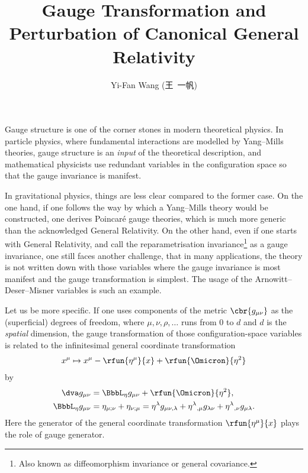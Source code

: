 \documentclass[a4paper,11pt]{article}
\title{Gauge Transformation and Perturbation of Canonical General 
Relativity}
\author{Yi-Fan Wang (王\ 一帆)}
\begin{document}
\maketitle

Gauge structure is one of the corner stones in modern theoretical physics. In 
particle physics, where fundamental interactions are modelled by Yang--Mills 
theories, gauge structure is an \emph{input} of the theoretical description, 
and mathematical physicists use redundant variables in the configuration space 
so that the gauge invariance is manifest.

In gravitational physics, things are less clear compared to the former case. On 
the one hand, if one follows the way by which a Yang--Mills theory would be 
constructed, one derives Poincar\'e gauge theories, which is much more generic 
than the acknowledged General Relativity. On the other hand, even if one starts 
with General Relativity, and call the reparametrisation 
invariance\footnote{Also known as diffeomorphism invariance or general 
covariance.} as a gauge invariance, one still faces another challenge, that in 
many applications, the theory is not written down with those variables where the 
gauge invariance is most manifest and the gauge transformation is simplest. The 
usage of the Arnowitt--Deser--Misner variables is such an example.

Let us be more specific. If one uses components of the metric 
$\cbr{g_{\mu\nu}}$ as the (superficial) degrees of freedom, where $\mu, \nu, 
\rho, \ldots$ runs from $0$ to $d$ and $d$ is the \emph{spatial} dimension, the 
gauge transformation of those configuration-space variables is related to the 
infinitesimal general coordinate 
transformation
\begin{align}
x^\mu \mapsto x^\mu - \rfun{\eta^\mu}{x} +
\rfun{\Omicron}{\eta^2}
\end{align}
by
\begin{align}
\dva g_{\mu\nu} &= \BbbL_\eta g_{\mu\nu} + \rfun{\Omicron}{\eta^2},
\nonumber \\
\BbbL_\eta g_{\mu\nu} &= \eta_{\mu;\nu} + \eta_{\nu;\mu}
= \eta^\lambda g_{\mu\nu,\lambda} + 
\eta^{\lambda}{}_{,\mu} g_{\lambda\nu} +
\eta^{\lambda}{}_{,\nu} g_{\mu\lambda}.
\label{eq:gauge-gmunu}
\end{align}
Here the generator of the general coordinate transformation $\rfun{\eta^\mu}{x}$ 
plays the role of gauge generator.
\end{document}
